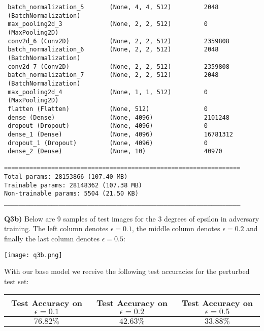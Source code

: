 \documentclass{article}
\begin{document}
\begin{titlepage}
\begin{lstlisting}
 batch_normalization_5       (None, 4, 4, 512)         2048      
 (BatchNormalization)                                                                                                       
 max_pooling2d_3             (None, 2, 2, 512)         0         
 (MaxPooling2D)                                                                                                                   
 conv2d_6 (Conv2D)           (None, 2, 2, 512)         2359808                                                     
 batch_normalization_6       (None, 2, 2, 512)         2048      
 (BatchNormalization)
 conv2d_7 (Conv2D)           (None, 2, 2, 512)         2359808                                                            
 batch_normalization_7       (None, 2, 2, 512)         2048      
 (BatchNormalization)                                                                                                         
 max_pooling2d_4             (None, 1, 1, 512)         0         
 (MaxPooling2D)                                                                                                                      
 flatten (Flatten)           (None, 512)               0                                                               
 dense (Dense)               (None, 4096)              2101248                                                               
 dropout (Dropout)           (None, 4096)              0                                                                 
 dense_1 (Dense)             (None, 4096)              16781312                                                           
 dropout_1 (Dropout)         (None, 4096)              0                                                            
 dense_2 (Dense)             (None, 10)                40970     
                                                                 
=================================================================
Total params: 28153866 (107.40 MB)
Trainable params: 28148362 (107.38 MB)
Non-trainable params: 5504 (21.50 KB)
_________________________________________________________________
\end{lstlisting}
\textbf{Q3b)} Below are 9 samples of test images for the 3 degrees of epsilon in adversary training. The left column denotes $\epsilon = 0.1$, the middle column denotes $\epsilon = 0.2$ and finally the last column denotes $\epsilon = 0.5$:
\begin{center}
\texttt{[image: q3b.png]}
\end{center}
With our base model we receive the following test accuracies for the perturbed test set:
\begin{center}
\begin{tabular}{||c | c |c ||} 
 \hline
 Test Accuracy on $ \epsilon = 0.1$ & Test Accuracy on $ \epsilon = 0.2$ & Test Accuracy on $ \epsilon = 0.5$ \\ [0.5ex] 
 \hline
 $76.82\%$ & $42.63\%$ & $33.88\%$ \\ 
 \hline
\end{tabular}
\end{center}
\end{titlepage}
\end{document}

